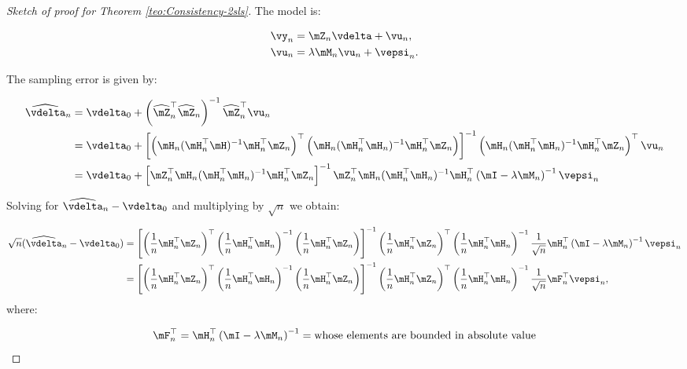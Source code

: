 \documentclass[english,12pt]{book}\usepackage[]{graphicx}\usepackage[]{xcolor}
\begin{document}
\begin{proof}[Sketch of proof for Theorem \ref{teo:Consistency-2sls}]
The model is:

\begin{equation*}
\begin{aligned}
	\vy_n & = \mZ_n\vdelta + \vu_n,\\
	\vu_n & = \lambda \mM_n \vu_n + \vepsi_n.
\end{aligned}
\end{equation*}


The sampling error is given by:

\begin{equation*}
  \begin{aligned}
     \widehat{\vdelta}_n & =  \vdelta_0 + \left(\widehat{\mZ}^\top_n\widehat{\mZ}_n\right)^{-1}\widehat{\mZ}^\top_n\vu_n \\
     & = \vdelta_0 + \left[\left(\mH_n(\mH_n^\top\mH)^{-1}\mH_n^\top\mZ_n\right)^\top\left(\mH_n(\mH^\top_n\mH_n)^{-1}\mH^\top_n\mZ_n\right)\right]^{-1}\left(\mH_n(\mH_n^\top\mH_n)^{-1}\mH_n^\top\mZ_n\right)^\top\vu_n\\
     & = \vdelta_0 + \left[\mZ^\top_n \mH_n (\mH^\top_n\mH_n)^{-1}\mH^\top_n\mZ_n\right]^{-1}\mZ^\top_n\mH_n(\mH^\top_n\mH_n)^{-1}\mH^\top_n\left(\mI -\lambda\mM_n\right)^{-1}\vepsi_n
  \end{aligned}
\end{equation*}

 Solving for $\widehat{\vdelta}_{n} - \vdelta_0$ and multiplying by $\sqrt{n}$ we obtain:

\begin{equation*}
\begin{aligned}
\sqrt{n}(\widehat{\vdelta}_{n} - \vdelta_0) & = \left[\left(\frac{1}{n}\mH^\top_n\mZ_n \right)^\top\left(\frac{1}{n}\mH^\top_n\mH_n\right)^{-1}\left(\frac{1}{n}\mH^\top_n\mZ_n \right)\right]^{-1}\left(\frac{1}{n}\mH^\top_n\mZ_n \right)^\top\left(\frac{1}{n}\mH^\top_n\mH_n\right)^{-1}\frac{1}{\sqrt{n}}\mH^\top_n\left(\mI -\lambda\mM_n\right)^{-1}\vepsi_n \\
             & = \left[\left(\frac{1}{n}\mH^\top_n\mZ_n \right)^\top\left(\frac{1}{n}\mH^\top_n\mH_n\right)^{-1}\left(\frac{1}{n}\mH^\top_n\mZ_n \right)\right]^{-1}\left(\frac{1}{n}\mH^\top_n\mZ_n \right)^\top\left(\frac{1}{n}\mH^\top_n\mH_n\right)^{-1}\frac{1}{\sqrt{n}}\mF_n^\top\vepsi_n,
\end{aligned}
\end{equation*}
%
where:

\begin{equation*}
\mF_n^\top = \mH^\top_n\left(\mI -\lambda\mM_n\right)^{-1} = \mbox{whose elements are bounded in absolute value}
\end{equation*}


\end{proof}
\end{document}
